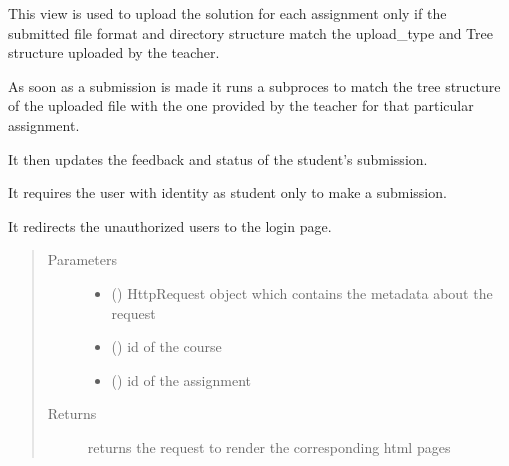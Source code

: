 \documentclass[letterpaper,10pt,english]{sphinxmanual}
\begin{document}
\begin{fulllineitems}
\label{\detokenize{users:users.views.solution_upload}}
\sphinxAtStartPar
This view is used to upload the solution for each assignment only if the submitted file format and directory structure match the upload\_type and Tree structure uploaded by the teacher.

\sphinxAtStartPar
As soon as a submission is made it runs a subproces to match the tree structure of the uploaded file with the one provided by the teacher for that particular assignment.

\sphinxAtStartPar
It then updates the feedback and status of the student’s submission.

\sphinxAtStartPar
It requires the user with identity as student only to make a submission.

\sphinxAtStartPar
It redirects the unauthorized users to the login page.
\begin{quote}\begin{description}
\item[{Parameters}] \leavevmode\begin{itemize}
\item {} 
\sphinxAtStartPar
{} () \textendash{} HttpRequest object which contains the metadata about the request

\item {} 
\sphinxAtStartPar
{} () \textendash{} id of the course

\item {} 
\sphinxAtStartPar
{} () \textendash{} id of the assignment

\end{itemize}

\item[{Returns}] \leavevmode
\sphinxAtStartPar
returns the request to render the corresponding html pages

\end{description}\end{quote}

\end{fulllineitems}
\end{document}

